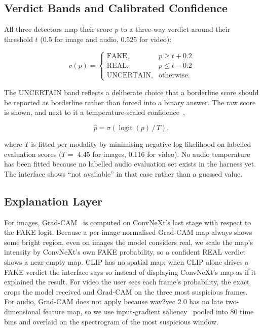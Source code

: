 \documentclass[conference]{IEEEtran}
\begin{document}
\subsection{Verdict Bands and Calibrated Confidence}
All three detectors map their score $p$ to a three-way verdict around their threshold $t$ (0.5 for image and audio, 0.525 for video):

\begin{equation}
v(p) = \begin{cases} \text{FAKE}, & p \geq t + 0.2 \\ \text{REAL}, & p \leq t - 0.2 \\ \text{UNCERTAIN}, & \text{otherwise.} \end{cases}
\end{equation}

The UNCERTAIN band reflects a deliberate choice that a borderline score should be reported as borderline rather than forced into a binary answer. The raw score is shown, and next to it a temperature-scaled confidence~\cite{guo2017},

\begin{equation}
\hat{p} = \sigma\!\left(\operatorname{logit}(p)\,/\,T\right),
\end{equation}

where $T$ is fitted per modality by minimising negative log-likelihood on labelled evaluation scores ($T=$ 4.45 for images, 0.116 for video). No audio temperature has been fitted because no labelled audio evaluation set exists in the harness yet. The interface shows ``not available'' in that case rather than a guessed value.

\subsection{Explanation Layer}
For images, Grad-CAM~\cite{gradcam} is computed on ConvNeXt's last stage with respect to the FAKE logit. Because a per-image normalised Grad-CAM map always shows some bright region, even on images the model considers real, we scale the map's intensity by ConvNeXt's own FAKE probability, so a confident REAL verdict shows a near-empty map. CLIP has no spatial map; when CLIP alone drives a FAKE verdict the interface says so instead of displaying ConvNeXt's map as if it explained the result. For video the user sees each frame's probability, the exact crops the model received and Grad-CAM on the three most suspicious frames. For audio, Grad-CAM does not apply because wav2vec 2.0 has no late two-dimensional feature map, so we use input-gradient saliency~\cite{simonyan2014} pooled into 80 time bins and overlaid on the spectrogram of the most suspicious window.
\end{document}

